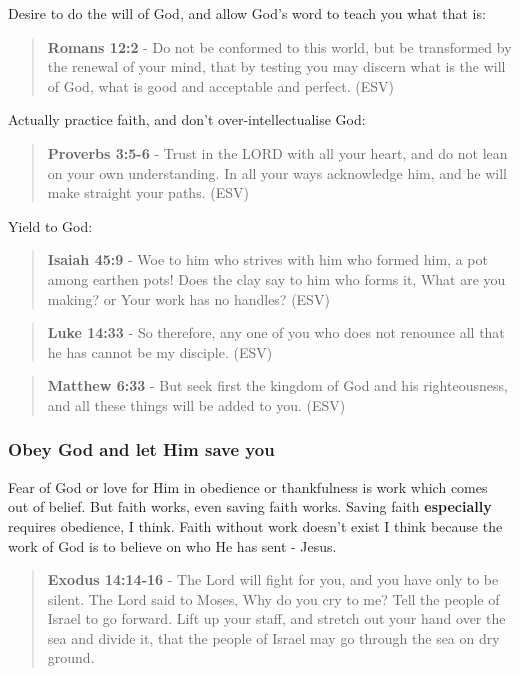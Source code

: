 \documentclass[11pt]{article}
\begin{document}
Desire to do the will of God, and allow God's word to teach you what that is:

\begin{quote}
\textbf{Romans 12:2} - Do not be conformed to this world, but be transformed by the renewal of your mind, that by testing you may discern what is the will of God, what is good and acceptable and perfect. (ESV)
\end{quote}

Actually practice faith, and don't over-intellectualise God:

\begin{quote}
\textbf{Proverbs 3:5-6} - Trust in the LORD with all your heart, and do not lean on your own understanding. In all your ways acknowledge him, and he will make straight your paths. (ESV)
\end{quote}

Yield to God:

\begin{quote}
\textbf{Isaiah 45:9} - Woe to him who strives with him who formed him, a pot among earthen pots! Does the clay say to him who forms it, What are you making? or Your work has no handles? (ESV)
\end{quote}

\begin{quote}
\textbf{Luke 14:33} - So therefore, any one of you who does not renounce all that he has cannot be my disciple. (ESV)
\end{quote}

\begin{quote}
\textbf{Matthew 6:33} - But seek first the kingdom of God and his righteousness, and all these things will be added to you. (ESV)
\end{quote}

\subsubsection{Obey God and let Him save you}
\label{sec:org7902a88}

Fear of God or love for Him in obedience or thankfulness is work which comes out of belief.
But faith works, even saving faith works. Saving faith \textbf{especially} requires obedience, I think.
Faith without work doesn't exist I think because the work of God is to believe on who He has sent - Jesus.

\begin{quote}
\textbf{Exodus 14:14-16} - The Lord will fight for you, and you have only to be silent.  The Lord said to Moses, Why do you cry to me? Tell the people of Israel to go forward.  Lift up your staff, and stretch out your hand over the sea and divide it, that the people of Israel may go through the sea on dry ground.
\end{quote}
\end{document}
